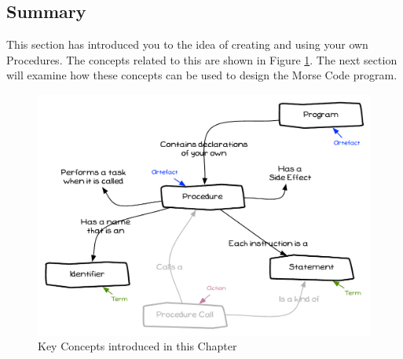 


\clearpage
\subsection{Summary} %
\label{sub:procedure-decl_summary}

This section has introduced you to the idea of creating and using your own Procedures. The concepts related to this are shown in Figure \ref{fig:procedure-decl-summary}. The next section will examine how these concepts can be used to design the Morse Code program.

\begin{figure}[h]
   \centering
   \includegraphics[width=\textwidth]{./topics/procedure-decl/diagrams/Summary} 
   \caption[Chapter Concepts]{Key Concepts introduced in this Chapter}
   \label{fig:procedure-decl-summary}
\end{figure}






